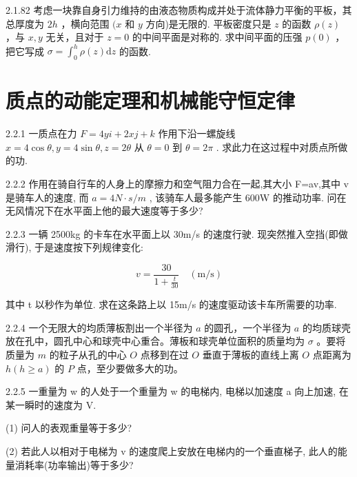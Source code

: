 \begin{problem}{2.1.82}
考虑一块靠自身引力维持的由液态物质构成并处于流体静力平衡的平板，其总厚度为 $2h$ ，横向范围 $(x$ 和 $y$ 方向)是无限的. 平板密度只是 $z$ 的函数 $\rho(z)$ ，与 $x, y$ 无关，且对于 $z = 0$ 的中间平面是对称的. 求中间平面的压强 $p(0)$ ，把它写成 $\sigma = \int_{0}^{h} \rho(z) \mathrm{d}z$ 的函数.
\end{problem}
\clearpage


\section{质点的动能定理和机械能守恒定律}

\begin{problem}{2.2.1}
一质点在力 $F = 4yi + 2xj + k$ 作用下沿一螺旋线 $x = 4\cos \theta, y = 4\sin \theta, z = 2\theta$ 从 $\theta = 0$ 到 $\theta = 2\pi$ . 求此力在这过程中对质点所做的功.
\end{problem}
\clearpage


\begin{problem}{2.2.2}
作用在骑自行车的人身上的摩擦力和空气阻力合在一起,其大小 F=av,其中 v 是骑车人的速度, 而 $a=4N \cdot s/m$ , 该骑车人最多能产生 600W 的推动功率. 问在无风情况下在水平面上他的最大速度等于多少?
\end{problem}
\clearpage


\begin{problem}{2.2.3}
一辆 2500kg 的卡车在水平面上以 30m/s 的速度行驶. 现突然推入空挡(即做滑行), 于是速度按下列规律变化:

\[
v = \frac {3 0}{1 + \frac {t}{3 0}} \quad (\mathrm{m/s})
\]

其中 t 以秒作为单位. 求在这条路上以 15m/s 的速度驱动该卡车所需要的功率.
\end{problem}
\clearpage


\begin{problem}{2.2.4}
一个无限大的均质薄板割出一个半径为 $a$ 的圆孔，一个半径为 $a$ 的均质球壳放在孔中，圆孔中心和球壳中心重合。薄板和球壳单位面积的质量均为 $\sigma$ 。要将质量为 $m$ 的粒子从孔的中心 $O$ 点移到在过 $O$ 垂直于薄板的直线上离 $O$ 点距离为 $h(h \geqslant a)$ 的 $P$ 点，至少要做多大的功。
\end{problem}
\clearpage


\begin{problem}{2.2.5}
一重量为 w 的人处于一个重量为 w 的电梯内, 电梯以加速度 a 向上加速, 在某一瞬时的速度为 V.

(1) 问人的表观重量等于多少?

(2) 若此人以相对于电梯为 v 的速度爬上安放在电梯内的一个垂直梯子, 此人的能量消耗率(功率输出)等于多少?
\end{problem}
\clearpage



